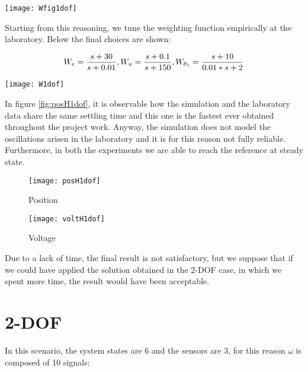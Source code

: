 \begin{figure*}[h]
	\centering
	\texttt{[image: Wfig1dof]}
	\caption{Weighting functions scheme}
	\label{Weighting functions scheme1dof}
\end{figure*}
Starting from this reasoning, we tune the weighting function empirically at the laboratory. Below the final choices are shown:

\begin{equation}
	W_e=
	\frac{s+30}{s+0.01}
	\\
	,
	\\
	W_u=
	\frac{s+0.1}{s+150}
	\\
	,
	\\
	W_{\theta_{1}}=
	\frac{s+10}{0.01*s+2}
\end{equation}

\begin{figure*}[h]
	\centering
	\texttt{[image: W1dof]}
	\caption{Weighting functions}
\end{figure*}

 In figure \ref{fig:posH1dof}, it is observable how the simulation and the laboratory data share the same settling time and this one is the fastest ever obtained throughout the project work. Anyway, the simulation does not model the oscillations arisen in the laboratory and it is for this reason not fully reliable. Furthermore, in both the experiments we are able to reach the reference at steady state.
 
 \begin{figure*}[h]
 	\centering
 	\begin{subfigure}{0.5\columnwidth}
 		\texttt{[image: posH1dof]}
 		\caption{Position}
 	\end{subfigure}
 	\begin{subfigure}{0.45\columnwidth}
 		\texttt{[image: voltH1dof]}
 		\caption{Voltage}
 	\end{subfigure}
 	\caption{Position step response}
 	\label{fig:posH1dof}
 \end{figure*}

Due to a lack of time, the final result is not satisfactory, but we suppose that if we could have applied the solution obtained in the 2-DOF case, in which we spent more time, the result would have been acceptable.
\newpage
\section{2-DOF}
In this scenario, the system states are 6 and the sensors are 3, for this reason $\omega$ is composed of 10 signals:

